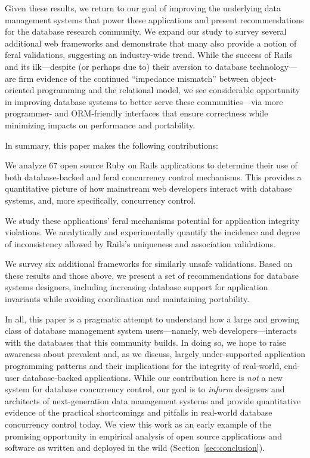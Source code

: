 Given these results, we return to our goal of improving the underlying
data management systems that power these applications and present
recommendations for the database research community. We expand our
study to survey several additional web frameworks and demonstrate that
many also provide a notion of feral validations, suggesting an
industry-wide trend. While the success of Rails and its ilk---despite
(or perhaps due to) their aversion to database technology---are firm
evidence of the continued ``impedance mismatch'' between
object-oriented programming and the relational model, we see
considerable opportunity in improving database systems to better serve
these communities---via more programmer- and ORM-friendly interfaces
that ensure correctness while minimizing impacts on performance and
portability.

In summary, this paper makes the following contributions:
\begin{myitemize}
\item We analyze 67 open source Ruby on Rails applications to
  determine their use of both database-backed and feral concurrency
  control mechanisms. This provides a quantitative picture of how
  mainstream web developers interact with database systems, and, more
  specifically, concurrency control.

\item We study these applications' feral mechanisms potential for
  application integrity violations. We analytically and experimentally
  quantify the incidence and degree of inconsistency allowed by
  Rails's uniqueness and association validations.

\item We survey six additional frameworks for similarly unsafe
  validations. Based on these results and those above, we present a
  set of recommendations for database systems designers, including
  increasing database support for application invariants while avoiding
  coordination and maintaining portability.
\end{myitemize}

In all, this paper is a pragmatic attempt to understand how a large
and growing class of database management system users---namely, web
developers---interacts with the databases that this community
builds. In doing so, we hope to raise awareness about prevalent and,
as we discuss, largely under-supported application programming
patterns and their implications for the integrity of real-world,
end-user database-backed applications. While our contribution here is
\textit{not} a new system for database concurrency control, our goal
is to \textit{inform} designers and architects of next-generation data
management systems and provide quantitative evidence of the practical
shortcomings and pitfalls in real-world database concurrency control
today. We view this work as an early example of the promising
opportunity in empirical analysis of open source applications and
software as written and deployed in the wild
(Section~\ref{sec:conclusion}).

